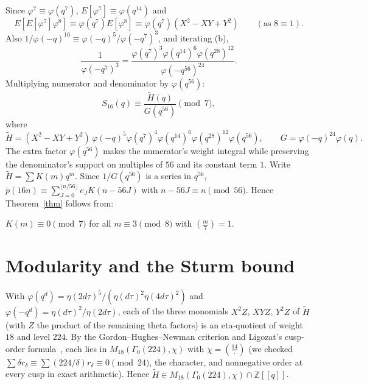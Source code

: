 \documentclass[11pt]{article}
\theoremstyle{remark}\newtheorem{remark}[theorem]{Remark}
\newcommand{\pb}{\overline{p}}
\begin{document}
Since $\varphi^7\equiv\varphi(q^7)$, $E[\varphi^7]\equiv\varphi(q^{14})$ and 
\[E[E[\varphi^7]\varphi^8]\equiv\varphi(q^7)E[\varphi^8]\equiv\varphi(q^7)(X^2-XY+Y^2)\qquad(\text{as }8\equiv1).\] Also $1/\varphi(-q)^{16}\equiv\varphi(-q)^5/\varphi(-q^7)^3$, and iterating (b),
\[\frac1{\varphi(-q^7)^3}=\frac{\varphi(q^7)^3\varphi(q^{14})^6\varphi(q^{28})^{12}}{\varphi(-q^{56})^{24}}.\] Multiplying numerator and denominator by $\varphi(q^{56})$:
\begin{equation}\label{eq:red} S_{16}(q)\equiv\frac{\widetilde H(q)}{G(q^{56})}\pmod 7,\end{equation}
where
\[\widetilde H=(X^2-XY+Y^2)\,\varphi(-q)^5\varphi(q^7)^4\varphi(q^{14})^6\varphi(q^{28})^{12}\varphi(q^{56}),\qquad G=\varphi(-q)^{24}\varphi(q).\]
The extra factor $\varphi(q^{56})$ makes the numerator's weight integral while preserving the denominator's support on multiples of $56$ and its constant term $1$.
Write $\widetilde H=\sum K(m)q^m$. Since $1/G(q^{56})$ is a series in $q^{56}$, $\pb(16n)\equiv\sum_{J=0}^{\lfloor n/56\rfloor}e_JK(n-56J)$ with $n-56J\equiv n\pmod{56}$. Hence Theorem~\ref{thm} follows from:

\begin{proposition}\label{prop:K} $K(m)\equiv0\pmod 7$ for all $m\equiv3\pmod8$ with $\left(\frac m7\right)=1$.\end{proposition}

\section{Modularity and the Sturm bound}
With $\varphi(q^d)=\eta(2d\tau)^5/(\eta(d\tau)^2\eta(4d\tau)^2)$ and $\varphi(-q^d)=\eta(d\tau)^2/\eta(2d\tau)$, each of the three monomials $X^2Z$, $XYZ$, $Y^2Z$ of $\widetilde H$ (with $Z$ the product of the remaining theta factors) is an eta-quotient of weight $18$ and level $224$. By the Gordon--Hughes--Newman criterion and Ligozat's cusp-order formula~\cite[Thms.~1.64, 1.65]{Ono}, each lies in $M_{18}(\Gamma_0(224),\chi)$ with $\chi=\left(\frac{14}{\cdot}\right)$ (we checked $\sum\delta r_\delta\equiv\sum(224/\delta)r_\delta\equiv0\pmod{24}$, the character, and nonnegative order at every cusp in exact arithmetic). Hence $\widetilde H\in M_{18}(\Gamma_0(224),\chi)\cap\mathbb Z[[q]]$.
\end{document}
